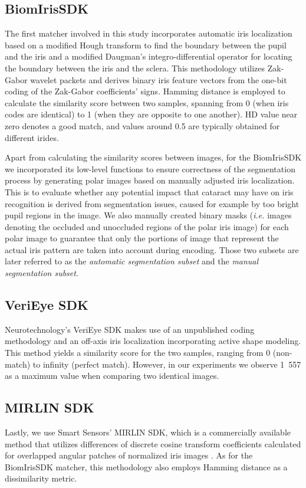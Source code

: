 \documentclass[a4paper]{spie}
\begin{document}
\subsection{BiomIrisSDK}
The first matcher involved in this study incorporates automatic iris localization based on a modified Hough transform to find the boundary between the pupil and the iris and a modified Daugman's integro-differential operator for locating the boundary between the iris and the sclera. This methodology utilizes Zak-Gabor wavelet packets and derives binary iris feature vectors from the one-bit coding of the Zak-Gabor coefficients' signs. Hamming distance is employed to calculate the similarity score between two samples, spanning from 0 (when iris codes are identical) to 1 (when they are opposite to one another). HD value near zero denotes a good match, and values around 0.5 are typically obtained for different irides.

Apart from calculating the similarity scores between images, for the BiomIrisSDK we incorporated its low-level functions to ensure correctness of the segmentation process by generating polar images based on manually adjusted iris localization. This is to evaluate whether any potential impact that cataract may have on iris recognition is derived from segmentation issues, caused for example by too bright pupil regions in the image. We also manually created binary masks (\emph{i.e.} images denoting the occluded and unoccluded regions of the polar iris image) for each polar image to guarantee that only the portions of image that represent the actual iris pattern are taken into account during encoding. Those two subsets are later referred to as the \emph{automatic segmentation subset} and the \emph{manual segmentation subset}.

\subsection{VeriEye SDK}
Neurotechnology's VeriEye SDK makes use of an unpublished coding methodology and an off-axis iris localization incorporating active shape modeling. This method yields a similarity score for the two samples, ranging from 0 (non-match) to infinity (perfect match). However, in our experiments we observe 1~557 as a maximum value when comparing two identical images.

\subsection{MIRLIN SDK}
Lastly, we use Smart Sensors' MIRLIN SDK, which is a commercially available method that utilizes differences of discrete cosine transform coefficients calculated for overlapped angular patches of normalized iris images \cite{DCT}. As for the BiomIrisSDK matcher, this methodology also employs Hamming distance as a dissimilarity metric.
\end{document}
